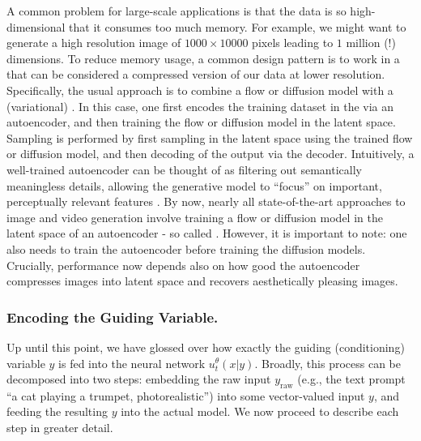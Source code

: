 \begin{remarkbox}
A common problem for large-scale applications is that the data is so high-dimensional that it consumes too much memory. For example, we might want to generate a high resolution image of $1000\times 10000$ pixels leading to $1$ million (!) dimensions. To reduce memory usage, a common design pattern is to work in a  that can be considered a compressed version of our data at lower resolution.  Specifically, the usual approach is to combine a flow or diffusion model with a (variational)  \cite{latent_diffusion}. In this case, one first encodes the training dataset in the  via an autoencoder, and then training the flow or diffusion model in the latent space. Sampling is performed by first sampling in the latent space using the trained flow or diffusion model, and then decoding of the output via the decoder. Intuitively, a well-trained autoencoder can be thought of as filtering out semantically meaningless details, allowing the generative model to ``focus'' on important, perceptually relevant features \cite{latent_diffusion}. By now, nearly all state-of-the-art approaches to image and video generation involve training a flow or diffusion model in the latent space of an autoencoder - so called  \citep{latent_diffusion,vahdat2021score}. However, it is important to note: one also needs to train the autoencoder before training the diffusion models. Crucially, performance now depends also on how good the autoencoder compresses images into latent space and recovers aesthetically pleasing images.
\end{remarkbox}
\subsubsection{Encoding the Guiding Variable.} 
Up until this point, we have glossed over how exactly the guiding (conditioning) variable $y$ is fed into the neural network $u_t^\theta(x|y)$. Broadly, this process can be decomposed into two steps: embedding the raw input $y_{\text{raw}}$ (e.g., the text prompt ``a cat playing a trumpet, photorealistic'') into some vector-valued input $y$, and feeding the resulting $y$ into the actual model. We now proceed to describe each step in greater detail.


